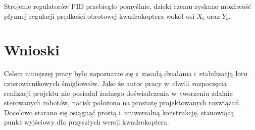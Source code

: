 \documentclass[11pt, twoside]{Thesis} %
\begin{document}
Strojenie regulatorów PID przebiegło pomyślnie, dzięki czemu zyskano mozliwość płynnej regulacji prędkości obrotowej kwadrokoptera wokół osi $X_b$ oraz $Y_b$. 

% 

\chapter{Wnioski} %

\label{Chapter8} %


Celem niniejszej pracy było zapoznanie się z~zasadą działania i~stabilizacją lotu czterowirnikowych śmigłowców. Jako że autor pracy w~chwili rozpoczęcia realizacji projektu nie posiadał żadnego doświadczenia w~tworzeniu zdalnie sterowanych robotów, nacisk położono na prostotę projektowanych rozwiązań. Docelowo starano się osiągnąć prostą i~uniwersalną konstrukcję, stanowiącą punkt wyjściowy dla przyszłych wersji kwadrokoptera.
\end{document}
